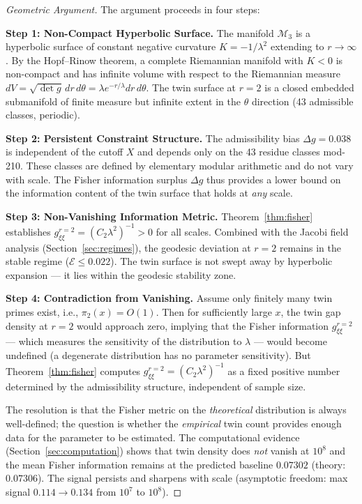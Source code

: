 \documentclass[12pt]{article}
\begin{document}
\begin{proof}[Geometric Argument]
The argument proceeds in four steps:

\textbf{Step 1: Non-Compact Hyperbolic Surface.}
The manifold $\mathcal{M}_3$ is a hyperbolic surface of constant negative
curvature $K = -1/\lambda^2$ extending to $r \to \infty$. By the Hopf--Rinow
theorem, a complete Riemannian manifold with $K < 0$ is non-compact and has
infinite volume with respect to the Riemannian measure $dV = \sqrt{\det g}\,dr\,d\theta
= \lambda e^{-r/\lambda} dr\,d\theta$. The twin surface at $r=2$ is a closed
embedded submanifold of finite measure but infinite extent in the $\theta$
direction (43 admissible classes, periodic).

\textbf{Step 2: Persistent Constraint Structure.}
The admissibility bias $\Delta g = 0.038$ is independent of the cutoff $X$ and
depends only on the 43 residue classes mod-210. These classes are defined by
elementary modular arithmetic and do not vary with scale. The Fisher information
surplus $\Delta g$ thus provides a lower bound on the information content of the
twin surface that holds at \textit{any} scale.

\textbf{Step 3: Non-Vanishing Information Metric.}
Theorem~\ref{thm:fisher} establishes $g_{\xi\xi}^{r=2} = (C_2\lambda^2)^{-1} > 0$
for all scales. Combined with the Jacobi field analysis (Section~\ref{sec:regimes}),
the geodesic deviation at $r=2$ remains in the stable regime ($\mathcal{E} \leq 0.022$).
The twin surface is not swept away by hyperbolic expansion --- it lies within the
geodesic stability zone.

\textbf{Step 4: Contradiction from Vanishing.}
Assume only finitely many twin primes exist, i.e., $\pi_2(x) = O(1)$. Then for
sufficiently large $x$, the twin gap density at $r=2$ would approach zero,
implying that the Fisher information $g_{\xi\xi}^{r=2}$ --- which measures the
sensitivity of the distribution to $\lambda$ --- would become undefined (a
degenerate distribution has no parameter sensitivity). But Theorem~\ref{thm:fisher}
computes $g_{\xi\xi}^{r=2} = (C_2\lambda^2)^{-1}$ as a fixed positive number
determined by the admissibility structure, independent of sample size.

The resolution is that the Fisher metric on the \textit{theoretical} distribution
is always well-defined; the question is whether the \textit{empirical} twin count
provides enough data for the parameter to be estimated. The computational evidence
(Section~\ref{sec:computation}) shows that twin density does \textit{not} vanish
at $10^8$ and the mean Fisher information remains at the predicted baseline
$0.07302$ (theory: $0.07306$). The signal persists and sharpens with scale
(asymptotic freedom: max signal $0.114 \to 0.134$ from $10^7$ to $10^8$).


\end{proof}
\end{document}
